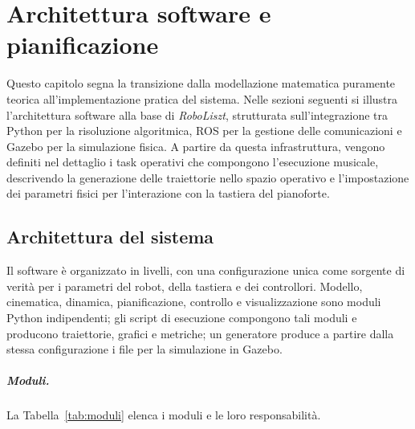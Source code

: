 \chapter{Architettura software e pianificazione}
\label{ch:software}

Questo capitolo segna la transizione dalla modellazione matematica puramente teorica all'implementazione pratica del sistema. Nelle sezioni seguenti si illustra l'architettura software alla base di \textit{RoboLiszt}, strutturata sull'integrazione tra Python per la risoluzione algoritmica, ROS per la gestione delle comunicazioni e Gazebo per la simulazione fisica. A partire da questa infrastruttura, vengono definiti nel dettaglio i task operativi che compongono l'esecuzione musicale, descrivendo la generazione delle traiettorie nello spazio operativo e l'impostazione dei parametri fisici per l'interazione con la tastiera del pianoforte.

\section{Architettura del sistema}
\label{sec:architettura}

Il software è organizzato in livelli, con una configurazione unica come sorgente di verità per i parametri del robot, della tastiera e dei controllori. Modello, cinematica, dinamica, pianificazione, controllo e visualizzazione sono moduli Python indipendenti; gli script di esecuzione compongono tali moduli e producono traiettorie, grafici e metriche; un generatore produce a partire dalla stessa configurazione i file per la simulazione in Gazebo.

\paragraph{Moduli.} La Tabella~\ref{tab:moduli} elenca i moduli e le loro responsabilità.

